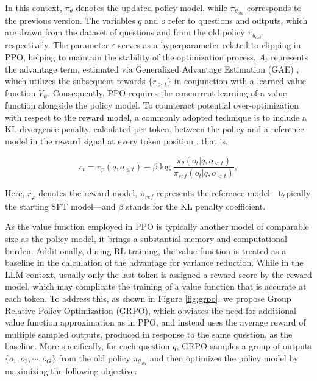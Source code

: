\begin{itemize}[topsep=0pt]
\begin{itemize}[topsep=0pt]
In this context, $\pi_{\theta}$ denotes the updated policy model, while $\pi_{\theta_{old}}$ corresponds to the previous version. The variables $q$ and $o$ refer to questions and outputs, which are drawn from the dataset of questions and from the old policy $\pi_{\theta_{old}}$, respectively. The parameter $\varepsilon$ serves as a hyperparameter related to clipping in PPO, helping to maintain the stability of the optimization process. $A_t$ represents the advantage term, estimated via Generalized Advantage Estimation (GAE) \citep{gae}, which utilizes the subsequent rewards $\{r_{\ge t}\}$ in conjunction with a learned value function $V_{\psi}$. Consequently, PPO requires the concurrent learning of a value function alongside the policy model. To counteract potential over-optimization with respect to the reward model, a commonly adopted technique is to include a KL-divergence penalty, calculated per token, between the policy and a reference model in the reward signal at every token position \citep{ouyang2022training}, that is,

\begin{equation}
    r_{t} = r_\varphi(q, o_{\le t}) - \beta \log\frac{\pi_{\theta}(o_{t}|q, o_{<t})}{\pi_{ref}(o_{t}|q, o_{<t})},
\label{eq:PPO-reward}
\end{equation}

Here, $r_\varphi$ denotes the reward model, $\pi_{ref}$ represents the reference model—typically the starting SFT model—and $\beta$ stands for the KL penalty coefficient.

As the value function employed in PPO is typically another model of comparable size as the policy model, it brings a substantial memory and computational burden. Additionally, during RL training, the value function is treated as a baseline in the calculation of the advantage for variance reduction. While in the LLM context, usually only the last token is assigned a reward score by the reward model, which may complicate the training of a value function that is accurate at each token. To address this, as shown in Figure \ref{fig:grpo}, we propose Group Relative Policy Optimization (GRPO), which obviates the need for additional value function approximation as in PPO, and instead uses the average reward of multiple sampled outputs, produced in response to the same question, as the baseline. More specifically, for each question $q$, GRPO samples a group of outputs $\{o_1, o_2, \cdots, o_G\}$  from the old policy  $\pi_{\theta_{old}}$  and then optimizes the policy model by maximizing the following objective:


\end{itemize}
\end{itemize}
